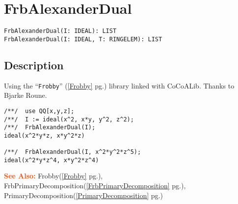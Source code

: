 \documentclass[a4paper]{mybook}
\newenvironment{command}{}{} %
\newcommand\SeeAlso{\par\textcolor{OrangeRed}{\textbf{\large See Also: }}}
\begin{document}
\section{FrbAlexanderDual}
\label{FrbAlexanderDual}
\begin{command} %


\begin{Verbatim}[label=syntax, rulecolor=\color{MidnightBlue},
frame=single]
FrbAlexanderDual(I: IDEAL): LIST
FrbAlexanderDual(I: IDEAL, T: RINGELEM): LIST
\end{Verbatim}


\subsection*{Description}

Using the ``\verb&Frobby&'' (\ref{Frobby} pg.\pageref{Frobby}) library linked with CoCoALib.
Thanks to Bjarke Roune.
\begin{Verbatim}[label=example, rulecolor=\color{PineGreen}, frame=single]
/**/  use QQ[x,y,z];
/**/  I := ideal(x^2, x*y, y^2, z^2);
/**/  FrbAlexanderDual(I);
ideal(x^2*y*z, x*y^2*z)

/**/  FrbAlexanderDual(I, x^2*y^2*z^5);
ideal(x^2*y*z^4, x*y^2*z^4)
\end{Verbatim}


\SeeAlso %
  Frobby(\ref{Frobby} pg.\pageref{Frobby}), 
    FrbPrimaryDecomposition(\ref{FrbPrimaryDecomposition} pg.\pageref{FrbPrimaryDecomposition}), 
    PrimaryDecomposition(\ref{PrimaryDecomposition} pg.\pageref{PrimaryDecomposition})
\end{command} %
\end{document}
